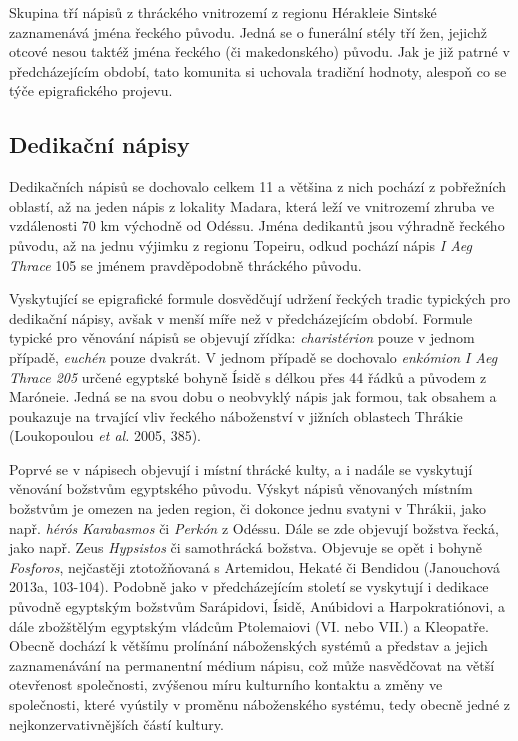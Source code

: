 Skupina tří nápisů z thráckého vnitrozemí z regionu Hérakleie Sintské zaznamenává jména řeckého původu. Jedná se o funerální stély tří žen, jejichž otcové nesou taktéž jména řeckého (či makedonského) původu. Jak je již patrné v předcházejícím období, tato komunita si uchovala tradiční hodnoty, alespoň co se týče epigrafického projevu.

\subsection[dedikační-nápisy-8]{Dedikační nápisy}

Dedikačních nápisů se dochovalo celkem 11 a většina z nich pochází z pobřežních oblastí, až na jeden nápis z lokality Madara, která leží ve vnitrozemí zhruba ve vzdálenosti 70 km východně od Odéssu. Jména dedikantů jsou výhradně řeckého původu, až na jednu výjimku z regionu Topeiru, odkud pochází nápis {\em I Aeg Thrace} 105 se jménem pravděpodobně thráckého původu.

Vyskytující se epigrafické formule dosvědčují udržení řeckých tradic typických pro dedikační nápisy, avšak v menší míře než v předcházejícím období. Formule typické pro věnování nápisů se objevují zřídka: {\em charistérion} pouze v jednom případě, {\em euchén} pouze dvakrát. V jednom případě se dochovalo {\em enkómion} {\em I Aeg Thrace 205} určené egyptské bohyně Ísidě s délkou přes 44 řádků a původem z Maróneie. Jedná se na svou dobu o neobvyklý nápis jak formou, tak obsahem a poukazuje na trvající vliv řeckého náboženství v jižních oblastech Thrákie (Loukopoulou {\em et al.} 2005, 385).

Poprvé se v nápisech objevují i místní thrácké kulty, a i nadále se vyskytují věnování božstvům egyptského původu. Výskyt nápisů věnovaných místním božstvům je omezen na jeden region, či dokonce jednu svatyni v Thrákii, jako např. {\em hérós} {\em Karabasmos} či {\em Perkón} z Odéssu. Dále se zde objevují božstva řecká, jako např. Zeus {\em Hypsistos} či samothrácká božstva. Objevuje se opět i bohyně {\em Fosforos}, nejčastěji ztotožňovaná s Artemidou, Hekaté či Bendidou (Janouchová 2013a, 103-104). Podobně jako v předcházejícím století se vyskytují i dedikace původně egyptským božstvům Sarápidovi, Ísidě, Anúbidovi a Harpokratiónovi, a dále zbožštělým egyptským vládcům Ptolemaiovi (VI. nebo VII.) a Kleopatře. Obecně dochází k většímu prolínání náboženských systémů a představ a jejich zaznamenávání na permanentní médium nápisu, což může nasvědčovat na větší otevřenost společnosti, zvýšenou míru kulturního kontaktu a změny ve společnosti, které vyústily v proměnu náboženského systému, tedy obecně jedné z nejkonzervativnějších částí kultury.

